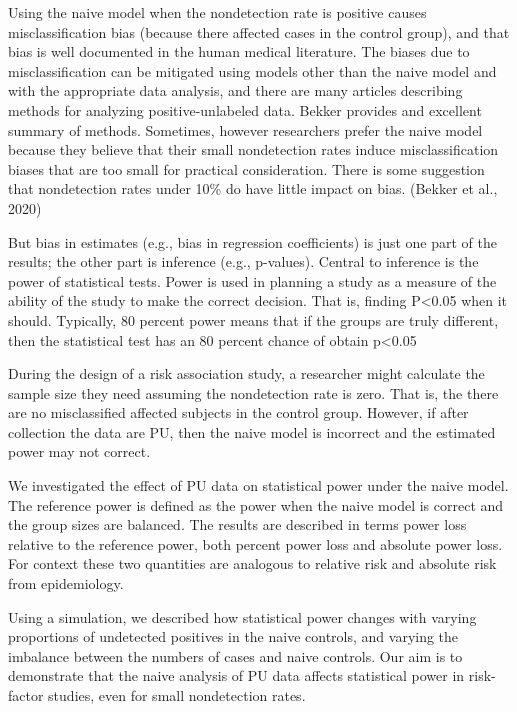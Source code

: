 \documentclass[
]{article}
\begin{document}
Using the naive model when the nondetection rate is positive causes
misclassification bias (because there affected cases in the control
group), and that bias is well documented in the human medical
literature. The biases due to misclassification can be mitigated using
models other than the naive model and with the appropriate data
analysis, and there are many articles describing methods for analyzing
positive-unlabeled data. Bekker provides and excellent summary of
methods. Sometimes, however researchers prefer the naive model because
they believe that their small nondetection rates induce
misclassification biases that are too small for practical consideration.
There is some suggestion that nondetection rates under 10\% do have
little impact on bias. (Bekker et al., 2020)

But bias in estimates (e.g., bias in regression coefficients) is just
one part of the results; the other part is inference (e.g., p-values).
Central to inference is the power of statistical tests. Power is used in
planning a study as a measure of the ability of the study to make the
correct decision. That is, finding P\textless0.05 when it should.
Typically, 80 percent power means that if the groups are truly
different, then the statistical test has an 80 percent chance of obtain
p\textless0.05

During the design of a risk association study, a researcher might
calculate the sample size they need assuming the nondetection rate is
zero. That is, the there are no misclassified affected subjects in the
control group. However, if after collection the data are PU, then the
naive model is incorrect and the estimated power may not correct.

We investigated the effect of PU data on statistical power under the
naive model. The reference power is defined as the power when the naive
model is correct and the group sizes are balanced. The results are
described in terms power loss relative to the reference power, both
percent power loss and absolute power loss. For context these two
quantities are analogous to relative risk and absolute risk from
epidemiology.

Using a simulation, we described how statistical power changes with
varying proportions of undetected positives in the naive controls, and
varying the imbalance between the numbers of cases and naive controls.
Our aim is to demonstrate that the naive analysis of PU data affects
statistical power in risk-factor studies, even for small nondetection
rates.
\end{document}
